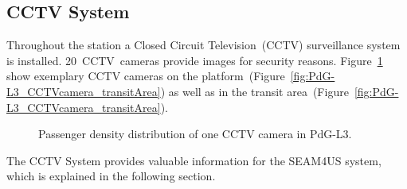\subsection{CCTV System}
\label{subsec:CCTVSystem}

Throughout the station a Closed Circuit Television~(CCTV) surveillance system is installed. 20~CCTV~cameras provide images for security reasons. Figure~\ref{fig:PdG-L3_CCTVcameras} show exemplary CCTV cameras on the platform~(Figure~\ref{fig:PdG-L3_CCTVcamera_transitArea}) as well as in the transit area~(Figure~\ref{fig:PdG-L3_CCTVcamera_transitArea}).

\begin{figure}[htbp]

  \centering

  \hfill

  \caption{Passenger density distribution of one CCTV camera in PdG-L3.}
  \label{fig:PdG-L3_CCTVcameras}

\end{figure}

The CCTV System provides valuable information for the SEAM4US system, which is explained in the following section.


